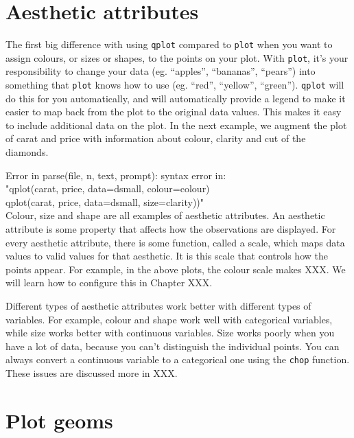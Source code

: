 \section{Aesthetic attributes}\label{sec:aesthetic_attributes}

The first big difference with using {\tt qplot} compared to {\tt plot} when you want to assign colours, or sizes or shapes, to the points on your plot.  With {\tt plot}, it's your responsibility to change your data (eg. ``apples'', ``bananas'', ``pears'') into something that {\tt plot} knows how to use (eg. ``red'', ``yellow'', ``green'').  {\tt qplot} will do this for you automatically, and will automatically provide a legend to make it easier to map back from the plot to the original data values.  This makes it easy to include additional data on the plot.  In the next example, we augment the plot of carat and price with information about colour, clarity and cut of the diamonds.

Error in parse(file, n, text, prompt): syntax error in: \\ 
"qplot(carat, price, data=dsmall, colour=colour) \\ 
qplot(carat, price, data=dsmall,  size=clarity))" \\ 


Colour, size and shape are all examples of aesthetic attributes.  An aesthetic attribute is some property that affects how the observations are displayed.  For every aesthetic attribute, there is some function, called a scale, which maps data values to valid values for that aesthetic.  It is this scale that controls how the points appear.  For example, in the above plots, the colour scale makes XXX.  We will learn how to configure this in Chapter XXX.

Different types of aesthetic attributes work better with different types of variables.  For example, colour and shape work well with categorical variables, while size works better with continuous variables.  Size works poorly when you have a lot of data, because you can't distinguish the individual points.  You can always convert a continuous variable to a categorical one using the {\tt chop} function.  These issues are discussed more in XXX.

\section{Plot geoms}\label{sec:plot_geoms}


